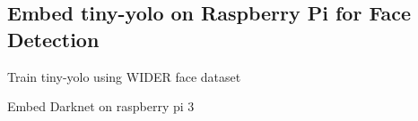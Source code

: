 \documentclass[letterpaper]{article}
\def\footerlink{http://github.com/alapha23/}
\renewenvironment{itemize}{
  \begin{list}{}{
    \setlength{\leftmargin}{1.5em}
  }
}{
  \end{list}
}
\begin{document}
\subsection*{\textbf{Embed tiny-yolo on Raspberry Pi for Face Detection}}
\begin{itemize}
\item Train tiny-yolo using WIDER face dataset	
\item Embed Darknet on raspberry pi 3
\end{itemize}
%
%

%


\end{document}
